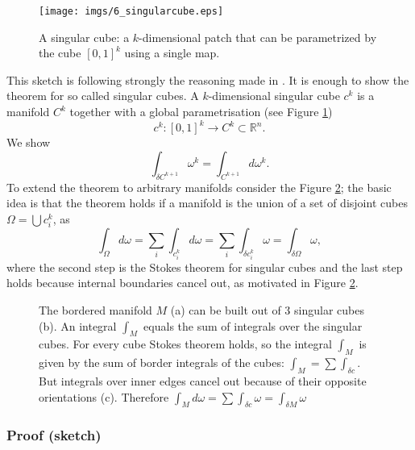 \begin{figure}%
\begin{center}
\texttt{[image: imgs/6\_singularcube.eps]}%
\end{center}
\vspace{-0.5cm}
\caption{A singular cube: a $k$-dimensional patch that can be parametrized by the cube $[0,1]^k$ using a single map.}%
\label{fig:6_singularCube}%
\end{figure}
This sketch is following strongly the reasoning made in \cite{globalAnalysis}.
It is enough to show the theorem for so called singular cubes. A $k$-dimensional singular cube $c^k$ is a manifold $C^k$ together with a global parametrisation (see Figure \ref{fig:6_singularCube})
\[c^k: [0,1]^k \to C^k \subset \mathbb R^n.\] 
We show
\[\int_{\delta C^{k+1}} \omega^{k} = \int_{C^{k+1}}d\omega^k.\] 
To extend the theorem to arbitrary manifolds consider the Figure \ref{fig::6_1_singularCubes}; the basic idea is that the theorem holds if a manifold is the union of a set of disjoint cubes $\Omega = \bigcup c^k_i$, as
\[\int_{\Omega} d\omega = \sum_i \int_{c^k_i} d\omega = \sum_i \int_{\delta c^k_i} \omega = \int_{\delta \Omega} \omega ,\]
where the second step is the Stokes theorem for singular cubes and the last step holds because internal boundaries cancel out, as motivated in Figure \ref{fig::6_1_singularCubes}.

\begin{figure}[t]
\begin{center}
\def\svgwidth{11cm}

\end{center}
\caption{The bordered manifold $M$ (a) can be built out of 3 singular cubes (b). An integral $\int_M$ equals the sum of integrals over the singular cubes. For every cube Stokes theorem holds, so the integral $\int_M$ is given by the sum of border integrals of the cubes: $\int_M = \sum \int_{\delta c}$. But integrals over inner edges cancel out because of their opposite orientations (c). Therefore $\int_M d\omega= \sum \int_{\delta c} \omega =\int_{\delta M}\omega$} 
\label{fig::6_1_singularCubes}
\end{figure}

\subsubsection{Proof (sketch)}

